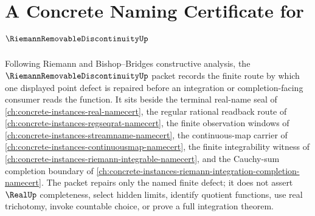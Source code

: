 \chapter{A Concrete Naming Certificate for $\RiemannRemovableDiscontinuityUp$}
\label{ch:concrete-instances-riemann-removable-discontinuity-namecert}

Following Riemann and Bishop--Bridges constructive analysis, the $\RiemannRemovableDiscontinuityUp$ packet records the finite route by which one displayed point defect is repaired before an integration or completion-facing consumer reads the function. It sits beside the terminal real-name seal of \autoref{ch:concrete-instances-real-namecert}, the regular rational readback route of \autoref{ch:concrete-instances-regseqrat-namecert}, the finite observation windows of \autoref{ch:concrete-instances-streamname-namecert}, the continuous-map carrier of \autoref{ch:concrete-instances-continuousmap-namecert}, the finite integrability witness of \autoref{ch:concrete-instances-riemann-integrable-namecert}, and the Cauchy-sum completion boundary of \autoref{ch:concrete-instances-riemann-integration-completion-namecert}. The packet repairs only the named finite defect; it does not assert $\RealUp$ completeness, select hidden limits, identify quotient functions, use real trichotomy, invoke countable choice, or prove a full integration theorem.

